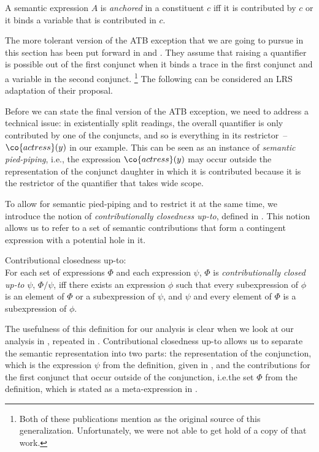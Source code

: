 \documentclass[output=paper]{langsci/langscibook}
\begin{document}
\ea \label{def-anchor}
A semantic expression $A$ is \emph{anchored} in a constituent $c$ iff it is contributed by $c$ or it binds a variable that is contributed in $c$.
\z 

The more tolerant version of the ATB exception that we are going to pursue in this section has been put forward in  \citet{Fox:95} and \citet{Sauerland:03}. 
They assume that raising a quantifier is possible out of the first conjunct when it binds a trace in the first conjunct and a variable in the second conjunct.%
\footnote{Both of these publications mention \citet{Ruys:93} as the original source of this generalization. Unfortunately, we were not able to get hold of a copy of that work.} 
The following can be considered an LRS adaptation of their proposal.


Before we can state the final version of the ATB exception, we need to address a technical issue: 
in existentially split readings, the overall quantifier is only contributed by one of the conjuncts, and so is everything in its restrictor~-- $\co{actress}(y)$ in our example. 
This can be seen as an instance of \emph{semantic pied-piping}, i.e., the expression $\co{actress}(y)$ may occur outside the representation of the conjunct daughter in which it is contributed because it is the restrictor of the quantifier that takes wide scope.

To allow for semantic pied-piping and to restrict it at the same time, we introduce the notion of \emph{contributionally closedness up-to}, defined in . 
This notion allows us to refer to a set of semantic contributions that form a contingent expression with a potential hole in it. 

\ea Contributional closedness up-to:\label{def-closed-upto}\\
For each set of expressions $\Phi$ and each expression $\psi$,
$\Phi$ is \emph{contributionally closed up-to} $\psi$, ${\Phi} / \psi$, iff 
there exists an expression $\phi$ such that 
every subexpression of $\phi$ is an element of $\Phi$ or a subexpression of $\psi$, and $\psi$ and every element of $\Phi$ is a subexpression of $\phi$. 
\z 

The usefulness of this definition for our analysis is clear when we look at our analysis in , repeated in .
Contributional closedness up-to allows us to separate the semantic representation into two parts: 
the representation of the conjunction, which is the expression $\psi$ from the definition, given in , and the contributions for the first conjunct that occur outside of the conjunction, i.e.\@ the set $\Phi$ from the definition, which is stated as a meta-expression in .
\end{document}
